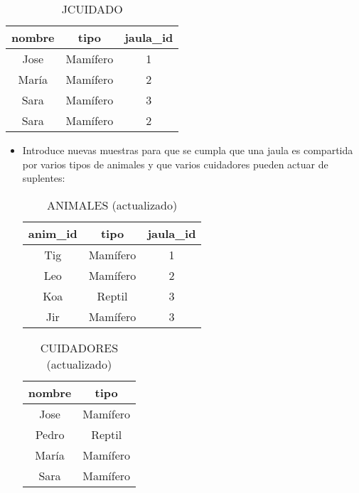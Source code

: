 \begin{enumerate}
    \begin{table}[h!]
    \centering
    \caption{JCUIDADO}
    \begin{tabular}{|c|c|c|}
    \hline
    \textbf{nombre} & \textbf{tipo} & \textbf{jaula\_id} \\ \hline
    Jose           & Mamífero      & 1                  \\ \hline
    María          & Mamífero      & 2                  \\ \hline
    Sara           & Mamífero      & 3                  \\ \hline
    Sara           & Mamífero      & 2                  \\ \hline
    \end{tabular}
    \end{table}
    \begin{itemize}
        \item Introduce nuevas muestras para que se cumpla que una jaula es compartida por varios tipos de animales y que varios cuidadores pueden actuar de suplentes:
        \begin{table}[h!]
        \centering
        \caption{ANIMALES (actualizado)}
        \begin{tabular}{|c|c|c|}
        \hline
        \textbf{anim\_id} & \textbf{tipo} & \textbf{jaula\_id} \\ \hline
        Tig              & Mamífero      & 1                  \\ \hline
        Leo              & Mamífero      & 2                  \\ \hline
        Koa              & Reptil        & 3                  \\ \hline
        Jir              & Mamífero      & 3                  \\ \hline
        \end{tabular}
        \end{table}

        \begin{table}[h!]
        \centering
        \caption{CUIDADORES (actualizado)}
        \begin{tabular}{|c|c|}
        \hline
        \textbf{nombre} & \textbf{tipo} \\ \hline
        Jose           & Mamífero      \\ \hline
        Pedro          & Reptil        \\ \hline
        María          & Mamífero      \\ \hline
        Sara           & Mamífero      \\ \hline
        \end{tabular}
        \end{table}


\end{itemize}
\end{enumerate}
